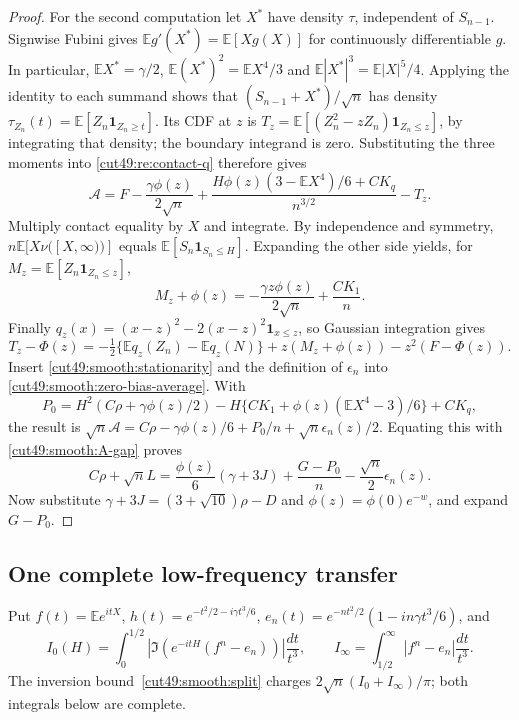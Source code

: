 \documentclass[11pt,a4paper]{article}
\numberwithin{equation}{section}
\theoremstyle{definition}
\theoremstyle{remark}
\newcommand{\E}{\mathbb E}
\newcommand{\phio}{\phi(0)}
\begin{document}
\begin{proof}
For the second computation let $X^*$ have density $\tau$, independent of
$S_{n-1}$. Signwise Fubini gives
$\E g'(X^*)=\E[Xg(X)]$ for continuously differentiable $g$.
In particular,
$\E X^*=\gamma/2$, $\E(X^*)^2=\E X^4/3$ and
$\E|X^*|^3=\E|X|^5/4$.
Applying the identity to each summand shows that
$(S_{n-1}+X^*)/\sqrt n$ has density
$\tau_{Z_n}(t)=\E[Z_n\mathbf1_{Z_n\ge t}]$.
Its CDF at $z$ is
$T_z=\E[(Z_n^2-zZ_n)\mathbf1_{Z_n\le z}]$, by integrating that density;
the boundary integrand is zero. Substituting the three moments into
\eqref{cut49:re:contact-q} therefore gives
\begin{equation}\label{cut49:smooth:zero-bias-average}
 \mathcal A=F-\frac{\gamma\phi(z)}{2\sqrt n}
 +\frac{H\phi(z)(3-\E X^4)/6+CK_q}{n^{3/2}}-T_z.
\end{equation}
Multiply contact equality by $X$ and integrate. By independence and symmetry,
$n\E[X\nu([X,\infty))]$ equals $\E[S_n\mathbf1_{S_n\le H}]$.
Expanding the other side yields, for $M_z=\E[Z_n\mathbf1_{Z_n\le z}]$,
\begin{equation}\label{cut49:smooth:stationarity}
 M_z+\phi(z)=-\frac{\gamma z\phi(z)}{2\sqrt n}+\frac{CK_1}{n}.
\end{equation}
Finally $q_z(x)=(x-z)^2-2(x-z)^2\mathbf1_{x\le z}$, so Gaussian
integration gives
\begin{equation}\label{cut49:smooth:truncated-square}
 T_z-\Phi(z)=-\tfrac12\{\E q_z(Z_n)-\E q_z(N)\}
 +z(M_z+\phi(z))-z^2(F-\Phi(z)).
\end{equation}
Insert \eqref{cut49:smooth:stationarity} and the definition of $\epsilon_n$
into \eqref{cut49:smooth:zero-bias-average}. With
\[
 P_0=H^2(C\rho+\gamma\phi(z)/2)
       -H\{CK_1+\phi(z)(\E X^4-3)/6\}+CK_q,
\]
the result is $\sqrt n\mathcal A=C\rho-\gamma\phi(z)/6+
P_0/n+\sqrt n\epsilon_n(z)/2$. Equating this with
\eqref{cut49:smooth:A-gap} proves
\begin{equation}\label{cut49:smooth:signed-identity}
 C\rho+\sqrt nL=\frac{\phi(z)}6(\gamma+3J)
                 +\frac{G-P_0}{n}-\frac{\sqrt n}2\epsilon_n(z).
\end{equation}
Now substitute $\gamma+3J=(3+\sqrt{10})\rho-D$ and
$\phi(z)=\phio e^{-w}$, and expand $G-P_0$.
\end{proof}

\subsection{One complete low-frequency transfer}
Put $f(t)=\E e^{itX}$, $h(t)=e^{-t^2/2-i\gamma t^3/6}$,
$e_n(t)=e^{-nt^2/2}(1-in\gamma t^3/6)$, and
\[
 I_0(H)=\int_0^{1/2}|\Im(e^{-itH}(f^n-e_n))|\frac{dt}{t^3},\qquad
 I_\infty=\int_{1/2}^\infty|f^n-e_n|\frac{dt}{t^3}.
\]
The inversion bound~\eqref{cut49:smooth:split} charges
$2\sqrt n(I_0+I_\infty)/\pi$; both integrals below are complete.
\end{document}
